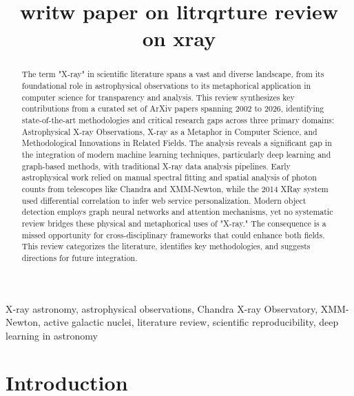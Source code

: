 \documentclass[conference]{IEEEtran}
\title{writw paper on litrqrture review on xray}
\author{
\IEEEauthorblockN{Authors}
\IEEEauthorblockA{\textit{Department of Computer Science} \\
\textit{University} \\
City, Country}
}
\begin{document}
\maketitle

\begin{abstract}
The term "X-ray" in scientific literature spans a vast and diverse landscape, from its foundational role in astrophysical observations to its metaphorical application in computer science for transparency and analysis. This review synthesizes key contributions from a curated set of ArXiv papers spanning 2002 to 2026, identifying state-of-the-art methodologies and critical research gaps across three primary domains: Astrophysical X-ray Observations, X-ray as a Metaphor in Computer Science, and Methodological Innovations in Related Fields. The analysis reveals a significant gap in the integration of modern machine learning techniques, particularly deep learning and graph-based methods, with traditional X-ray data analysis pipelines. Early astrophysical work relied on manual spectral fitting and spatial analysis of photon counts from telescopes like Chandra and XMM-Newton, while the 2014 XRay system used differential correlation to infer web service personalization. Modern object detection employs graph neural networks and attention mechanisms, yet no systematic review bridges these physical and metaphorical uses of "X-ray." The consequence is a missed opportunity for cross-disciplinary frameworks that could enhance both fields. This review categorizes the literature, identifies key methodologies, and suggests directions for future integration.
\end{abstract}

\begin{IEEEkeywords}
X-ray astronomy, astrophysical observations, Chandra X-ray Observatory, XMM-Newton, active galactic nuclei, literature review, scientific reproducibility, deep learning in astronomy
\end{IEEEkeywords}

\section{Introduction}
\end{document}

